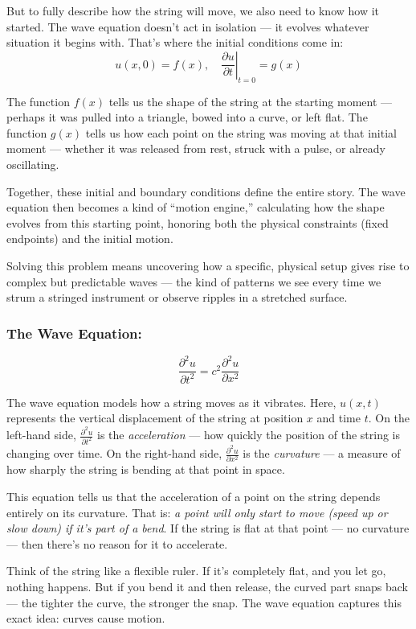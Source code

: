 But to fully describe how the string will move, we also need to know how it started. The wave equation doesn’t act in isolation — it evolves whatever situation it begins with. That’s where the initial conditions come in:
\[
u(x,0) = f(x), \quad \left.\frac{\partial u}{\partial t}\right|_{t=0} = g(x)
\]

The function \( f(x) \) tells us the shape of the string at the starting moment — perhaps it was pulled into a triangle, bowed into a curve, or left flat. The function \( g(x) \) tells us how each point on the string was moving at that initial moment — whether it was released from rest, struck with a pulse, or already oscillating.

Together, these initial and boundary conditions define the entire story. The wave equation then becomes a kind of “motion engine,” calculating how the shape evolves from this starting point, honoring both the physical constraints (fixed endpoints) and the initial motion.

Solving this problem means uncovering how a specific, physical setup gives rise to complex but predictable waves — the kind of patterns we see every time we strum a stringed instrument or observe ripples in a stretched surface.


\subsubsection{The Wave Equation:}
\[
\frac{\partial^2 u}{\partial t^2} = c^2 \frac{\partial^2 u}{\partial x^2}
\]

The wave equation models how a string moves as it vibrates. Here, \( u(x, t) \) represents the vertical displacement of the string at position \( x \) and time \( t \). On the left-hand side, \( \frac{\partial^2 u}{\partial t^2} \) is the \textit{acceleration} — how quickly the position of the string is changing over time. On the right-hand side, \( \frac{\partial^2 u}{\partial x^2} \) is the \textit{curvature} — a measure of how sharply the string is bending at that point in space.

This equation tells us that the acceleration of a point on the string depends entirely on its curvature. That is: \textit{a point will only start to move (speed up or slow down) if it’s part of a bend}. If the string is flat at that point — no curvature — then there’s no reason for it to accelerate.

Think of the string like a flexible ruler. If it’s completely flat, and you let go, nothing happens. But if you bend it and then release, the curved part snaps back — the tighter the curve, the stronger the snap. The wave equation captures this exact idea: curves cause motion.

